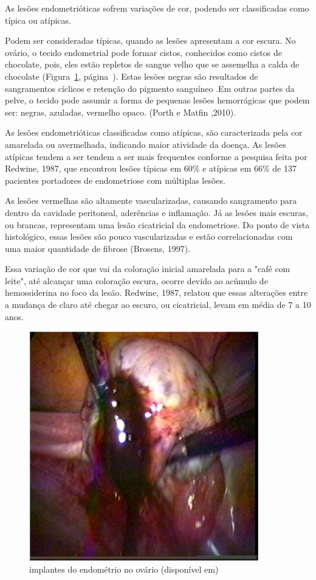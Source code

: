 \documentclass[12pt]{article} %
\begin{document}
As lesões endometrióticas sofrem variações de cor, podendo ser classificadas como típica ou atípicas.

Podem ser consideradas típicas, quando as lesões apresentam a cor escura.
No ovário, o tecido endometrial pode formar cistos, conhecidos como
cistos de chocolate, pois, eles estão repletos de sangue velho que se
assemelha a calda de chocolate (Figura~\ref{implantes do endometrio},
página~\pageref{implantes do endometrio}). Estas lesões negras são resultados de sangramentos
cíclicos e retenção do pigmento sanguíneo .Em outras partes da pelve,
o tecido pode assumir a forma de pequenas lesões hemorrágicas que
podem ser: negras, azuladas, vermelho opaco. (Porth e
Matfin ,2010).

As lesões endometrióticas classificadas como atípicas,
são caracterizada pela cor amarelada ou avermelhada, indicando maior
atividade da doença. As lesões atípicas tendem a ser tendem a ser mais frequentes 
conforme a pesquisa feita por Redwine, 1987,  que encontrou lesões típicas em 60\% e atípicas 
em 66\% de 137 pacientes portadores de endometriose com múltiplas lesões.


As lesões vermelhas são altamente vascularizadas, causando sangramento
para dentro da cavidade peritoneal, aderências e inflamação. Já as
lesões mais escuras, ou brancas, representam uma lesão cicatricial
da endometriose. Do ponto de vista histológico, essas lesões são pouco
vascularizadas e estão correlacionadas com uma maior quantidade de
fibrose (Brosens, 1997).

Essa variação de cor que vai da coloração
inicial amarelada para a "café com leite", até alcançar uma coloração
escura, ocorre devido ao acúmulo de hemossiderina no
foco da lesão. Redwine, 1987, relatou que essas alterações entre a
mudança de claro até chegar ao escuro, ou cicatricial, levam em média
de 7 a 10 anos.


\begin{figure}[h!] 
\centering
\includegraphics[width=10cm]{endometriomaroto.jpg}
\caption[Endometriose: implantes do endométrio no ovário] {implantes do endométrio no ovário (disponível em)}
\label{implantes do endometrio}
\end{figure} 
\end{document}

